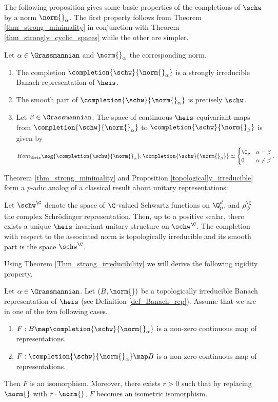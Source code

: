 The following proposition gives some basic properties of the completions of $\schw$ by a norm $\norm{}_\alpha$.
The first property follows from Theorem \ref{thm_strong_minimality} in conjunction with Theorem \ref{thm_strongly_cyclic_spaces} while the other are simpler.
\begin{prop}\label{topologically_irreducible}
Let $\alpha\in\Grassmannian$ and $\norm{}_\alpha$ the corresponding norm.
    \begin{enumerate}
    \item The completion $\completion{\schw}{\norm{}_\alpha}$ is a strongly irreducible Banach representation of $\heis$.
    \item The smooth part of $\completion{\schw}{\norm{}_\alpha}$ is precisely $\schw$.
    \item Let $\beta\in\Grassmannian$.
    The space of continuous $\heis$-equivariant maps from $\completion{\schw}{\norm{}_\alpha}$ to $\completion{\schw}{\norm{}_\beta}$ is given by
    \[Hom_{\heis}\sog{\completion{\schw}{\norm{}_\alpha},\completion{\schw}{\norm{}_\beta}}\simeq
    \begin{cases}
    \C_p & \alpha=\beta\\
    0    & \alpha\neq \beta
    \end{cases}.\]
    \end{enumerate}
\end{prop} 
Theorem \ref{thm_strong_minimality} and Proposition \ref{topologically_irreducible} form a $p$-adic analog of a classical result about unitary representations:
\begin{thm}
Let $\schw^{\C}$ denote the space of $\C$-valued Schwartz functions on $\Q_p^d$, and $\rho_\psi^{\C}$ the complex Schrödinger representation.
Then, up to a positive scalar, there exists a unique $\heis$-invariant unitary structure on $\schw^{\C}$.
The completion with respect to the associated norm is topologically irreducible and its smooth part is the space $\schw^{\C}$.
\end{thm} 

Using Theorem \ref{Thm_strong_irreducibility} we will derive the following rigidity property.

\begin{thm}\label{thm_Rigidity}
Let $\alpha\in\Grassmannian$.
Let $(B,\norm{})$ be a topologically irreducible Banach representation of $\heis$ (see Definition \ref{def_Banach_rep}).
Assume that we are in one of the two following cases.
    \begin{enumerate}
    \item $F:B\map \completion{\schw}{\norm{}_\alpha}$ is a non-zero continuous map of representations.
    \item $F:\completion{\schw}{\norm{}_\alpha}\map B$ is a non-zero continuous map of representations.
    \end{enumerate}
Then $F$ is an isomorphism.
Moreover, there exists $r>0$ such that by replacing $\norm{}$ with $r\cdot \norm{}$, $F$ becomes an isometric isomorphism.
\end{thm} 

